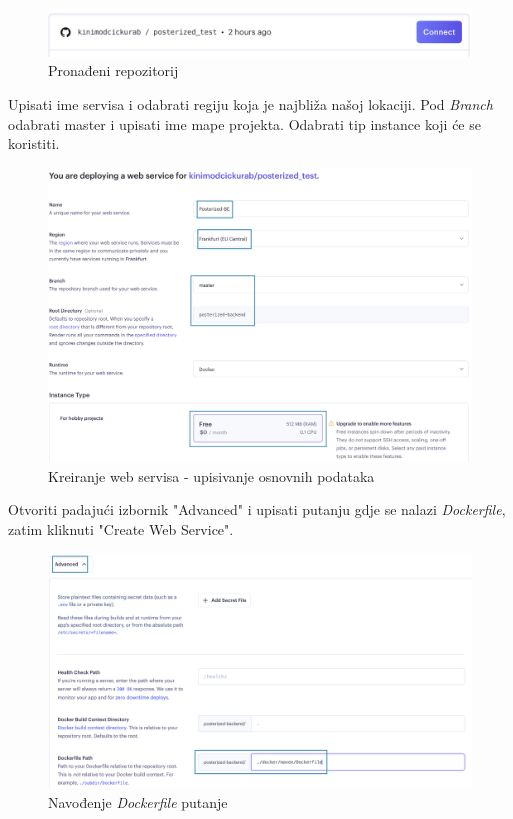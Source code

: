 \begin{enumerate}
			\begin{figure}[H]
				\includegraphics[scale=0.3]{slike/deploy/backend3.png} %
				\centering
				\caption{Pronađeni repozitorij}
				\label{fig:promjene}
			\end{figure}
			Upisati ime servisa i odabrati regiju koja je najbliža našoj lokaciji.  Pod \textit{Branch} odabrati master i upisati ime mape projekta. Odabrati tip instance koji će se koristiti.
			\begin{figure}[H]
				\includegraphics[scale=0.3]{slike/deploy/backend4.png} %
				\centering
				\caption{Kreiranje web servisa - upisivanje osnovnih podataka}
				\label{fig:promjene}
			\end{figure}
			
			Otvoriti padajući izbornik "Advanced" i upisati putanju gdje se nalazi \textit{Dockerfile}, zatim kliknuti "Create Web Service".
			\begin{figure}[H]
				\includegraphics[scale=0.35]{slike/deploy/backend5.png} %
				\centering
				\caption{Navođenje \textit{Dockerfile} putanje}
				\label{fig:promjene}
			\end{figure}
			

\end{enumerate}
